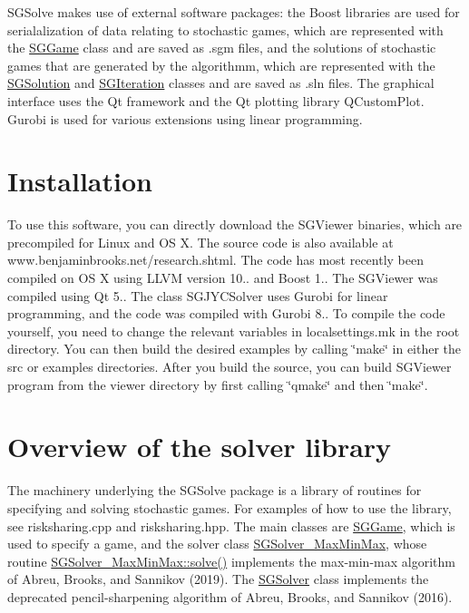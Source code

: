 S\+G\+Solve makes use of external software packages\+: the Boost libraries are used for serialalization of data relating to stochastic games, which are represented with the \hyperlink{classSGGame}{S\+G\+Game} class and are saved as .sgm files, and the solutions of stochastic games that are generated by the algorithmm, which are represented with the \hyperlink{classSGSolution}{S\+G\+Solution} and \hyperlink{classSGIteration}{S\+G\+Iteration} classes and are saved as .sln files. The graphical interface uses the Qt framework and the Qt plotting library Q\+Custom\+Plot. Gurobi is used for various extensions using linear programming.\hypertarget{index_installsec}{}\section{Installation}\label{index_installsec}
To use this software, you can directly download the S\+G\+Viewer binaries, which are precompiled for Linux and OS X. The source code is also available at www.\+benjaminbrooks.\+net/research.shtml. The code has most recently been compiled on OS X using L\+L\+VM version 10.. and Boost 1.. The S\+G\+Viewer was compiled using Qt 5.. The class S\+G\+J\+Y\+C\+Solver uses Gurobi for linear programming, and the code was compiled with Gurobi 8.. To compile the code yourself, you need to change the relevant variables in localsettings.\+mk in the root directory. You can then build the desired examples by calling \char`\"{}make\char`\"{} in either the src or examples directories. After you build the source, you can build S\+G\+Viewer program from the viewer directory by first calling \char`\"{}qmake\char`\"{} and then \char`\"{}make\char`\"{}.\hypertarget{index_solversec}{}\section{Overview of the solver library}\label{index_solversec}
The machinery underlying the S\+G\+Solve package is a library of routines for specifying and solving stochastic games. For examples of how to use the library, see risksharing.\+cpp and risksharing.\+hpp. The main classes are \hyperlink{classSGGame}{S\+G\+Game}, which is used to specify a game, and the solver class \hyperlink{classSGSolver__MaxMinMax}{S\+G\+Solver\+\_\+\+Max\+Min\+Max}, whose routine \hyperlink{classSGSolver__MaxMinMax_aad121e84c1492524e439ffba05893f3d}{S\+G\+Solver\+\_\+\+Max\+Min\+Max\+::solve()} implements the max-\/min-\/max algorithm of Abreu, Brooks, and Sannikov (2019). The \hyperlink{classSGSolver}{S\+G\+Solver} class implements the deprecated pencil-\/sharpening algorithm of Abreu, Brooks, and Sannikov (2016).

